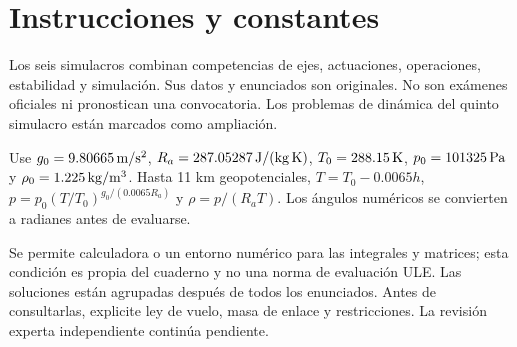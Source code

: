
\renewcommand{\studiumcoverphoto}{assets/cover-simulacros.jpg}

\frontmatter
\chapter*{Instrucciones y constantes}
Los seis simulacros combinan competencias de ejes, actuaciones, operaciones, estabilidad y simulación. Sus datos y enunciados son originales. No son exámenes oficiales ni pronostican una convocatoria. Los problemas de dinámica del quinto simulacro están marcados como ampliación.

Use $g_0=9.80665\,\mathrm{m/s^2}$, $R_a=287.05287\,\mathrm{J/(kg\,K)}$, $T_0=288.15\,\mathrm{K}$, $p_0=101325\,\mathrm{Pa}$ y $\rho_0=1.225\,\mathrm{kg/m^3}$. Hasta 11 km geopotenciales, $T=T_0-0.0065h$, $p=p_0(T/T_0)^{g_0/(0.0065R_a)}$ y $\rho=p/(R_aT)$. Los ángulos numéricos se convierten a radianes antes de evaluarse.

Se permite calculadora o un entorno numérico para las integrales y matrices; esta condición es propia del cuaderno y no una norma de evaluación ULE. Las soluciones están agrupadas después de todos los enunciados. Antes de consultarlas, explicite ley de vuelo, masa de enlace y restricciones. La revisión experta independiente continúa pendiente.
\par\smallskip

\tableofcontents
\mainmatter


